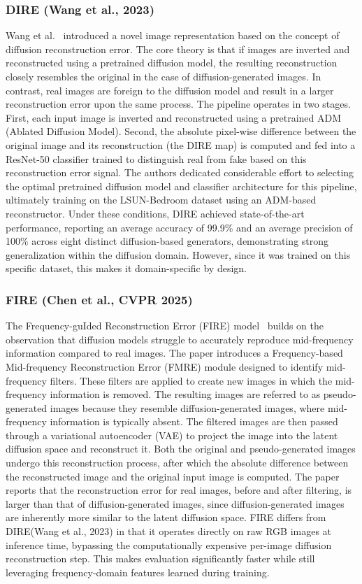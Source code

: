 \subsubsection{DIRE (Wang et al., 2023)}
\label{subsubsec:dire}
Wang et al.~\cite{wang2023dire} introduced a novel image representation based on the concept of diffusion reconstruction error. The core theory is that if images are inverted and reconstructed using a pretrained diffusion model, the resulting reconstruction closely resembles the original in the case of diffusion-generated images. In contrast, real images are foreign to the diffusion model and result in a larger reconstruction error upon the same process.
The pipeline operates in two stages. First, each input image is inverted and reconstructed using a pretrained ADM (Ablated Diffusion Model). Second, the absolute pixel-wise difference between the original image and its reconstruction (the DIRE map) is computed and fed into a ResNet-50 classifier trained to distinguish real from fake based on this reconstruction error signal. 
The authors dedicated considerable effort to selecting the optimal pretrained diffusion model and classifier architecture for this pipeline, ultimately training on the LSUN-Bedroom dataset using an ADM-based reconstructor. Under these conditions, DIRE achieved state-of-the-art performance, reporting an average accuracy of 99.9\% and an average precision of 100\% across eight distinct diffusion-based generators, demonstrating strong generalization within the diffusion domain. However, since it was trained on this specific dataset, this makes it domain-specific by design.

\subsubsection{FIRE (Chen et al., CVPR 2025)}
\label{subsubsec:fire}
The Frequency-guIded Reconstruction Error (FIRE) model~\cite{chen2025fire} builds on the observation that diffusion models struggle to accurately reproduce mid-frequency information compared to real images.
The paper introduces a Frequency-based Mid-frequency Reconstruction Error (FMRE) module designed to identify mid-frequency filters. These filters are applied to create new images in which the mid-frequency information is removed. The resulting images are referred to as pseudo-generated images because they resemble diffusion-generated images, where mid-frequency information is typically absent.
The filtered images are then passed through a variational autoencoder (VAE) to project the image into the latent diffusion space and reconstruct it. Both the original and pseudo-generated images undergo this reconstruction process, after which the absolute difference between the reconstructed image and the original input image is computed.
The paper reports that the reconstruction error for real images, before and after filtering, is larger than that of diffusion-generated images, since diffusion-generated images are inherently more similar to the latent diffusion space.
FIRE differs from DIRE(Wang et al., 2023) in that it operates directly on raw RGB images at inference time, bypassing the computationally expensive per-image diffusion reconstruction step. This makes evaluation significantly faster while still leveraging frequency-domain features learned during training.